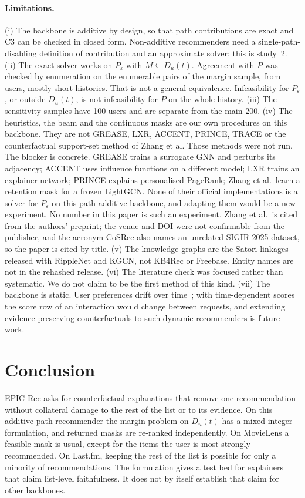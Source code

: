 \documentclass[11pt]{article}
\newcommand{\Peps}{P_\varepsilon}
\begin{document}
\paragraph{Limitations.} (i) The backbone is additive by design, so that path contributions are exact and C3 can be
checked in closed form. Non-additive recommenders need a single-path-disabling definition of contribution and an
approximate solver; this is study~2. (ii) The exact solver works on $\Peps$ with $M\subseteq D_u(t)$. Agreement with
$P$ was checked by enumeration on the \EnumPairs{} enumerable pairs of the margin sample, from \EnumUsers{} users,
mostly short histories. That is not a general equivalence. Infeasibility for $\Peps$, or outside $D_u(t)$, is not
infeasibility for $P$ on the whole history. (iii) The sensitivity samples have 100 users and are separate from the
main 200. (iv) The heuristics, the beam and the continuous masks are our own procedures on this backbone. They are
not GREASE, LXR, ACCENT, PRINCE, TRACE or the counterfactual support-set method of Zhang et al. Those methods were
not run. The blocker is concrete. GREASE trains a surrogate GNN and perturbs its adjacency; ACCENT uses influence
functions on a different model; LXR trains an explainer network; PRINCE explains personalised PageRank; Zhang et al.\
learn a retention mask for a frozen LightGCN. None of their official implementations is a solver for $P_\varepsilon$
on this path-additive backbone, and adapting them would be a new experiment. No number in this paper is such an
experiment. Zhang et al.\ is cited from the authors' preprint; the venue and DOI were not confirmable from the
publisher, and the acronym CoSRec also names an unrelated SIGIR 2025 dataset, so the paper is cited by title.
(v) The knowledge graphs are the Satori linkages
released with RippleNet and KGCN, not KB4Rec or Freebase. Entity names are not in the rehashed release.
(vi) The literature check was focused rather than
systematic. We do not claim to be the first method of this kind.
(vii) The backbone is static. User preferences drift over
time~\cite{tahmasbi2018temporal,tahmasbi2021coupled}; with time-dependent scores the score row of an interaction would
change between requests, and extending evidence-preserving counterfactuals to such dynamic recommenders is future
work.

\section{Conclusion}

EPIC-Rec asks for counterfactual explanations that remove one recommendation without collateral damage to the rest
of the list or to its evidence. On this additive path recommender the margin problem on $D_u(t)$ has a
mixed-integer formulation, and returned masks are re-ranked independently. On
MovieLens a feasible mask is usual, except for the items the user is most strongly recommended. On Last.fm,
keeping the rest of the list is possible for only a minority of recommendations. The formulation gives a test bed
for explainers that claim list-level faithfulness. It does not by itself establish that claim for other backbones.
\end{document}
